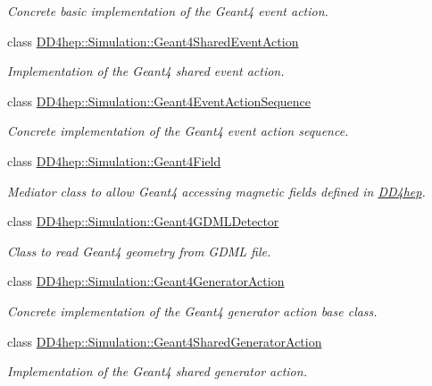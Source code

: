 \begin{DoxyCompactItemize}
\begin{DoxyCompactList}\small\item\em Concrete basic implementation of the Geant4 event action. \end{DoxyCompactList}\item 
class \hyperlink{class_d_d4hep_1_1_simulation_1_1_geant4_shared_event_action}{D\+D4hep\+::\+Simulation\+::\+Geant4\+Shared\+Event\+Action}
\begin{DoxyCompactList}\small\item\em Implementation of the Geant4 shared event action. \end{DoxyCompactList}\item 
class \hyperlink{class_d_d4hep_1_1_simulation_1_1_geant4_event_action_sequence}{D\+D4hep\+::\+Simulation\+::\+Geant4\+Event\+Action\+Sequence}
\begin{DoxyCompactList}\small\item\em Concrete implementation of the Geant4 event action sequence. \end{DoxyCompactList}\item 
class \hyperlink{class_d_d4hep_1_1_simulation_1_1_geant4_field}{D\+D4hep\+::\+Simulation\+::\+Geant4\+Field}
\begin{DoxyCompactList}\small\item\em Mediator class to allow Geant4 accessing magnetic fields defined in \hyperlink{namespace_d_d4hep}{D\+D4hep}. \end{DoxyCompactList}\item 
class \hyperlink{class_d_d4hep_1_1_simulation_1_1_geant4_g_d_m_l_detector}{D\+D4hep\+::\+Simulation\+::\+Geant4\+G\+D\+M\+L\+Detector}
\begin{DoxyCompactList}\small\item\em Class to read Geant4 geometry from G\+D\+ML file. \end{DoxyCompactList}\item 
class \hyperlink{class_d_d4hep_1_1_simulation_1_1_geant4_generator_action}{D\+D4hep\+::\+Simulation\+::\+Geant4\+Generator\+Action}
\begin{DoxyCompactList}\small\item\em Concrete implementation of the Geant4 generator action base class. \end{DoxyCompactList}\item 
class \hyperlink{class_d_d4hep_1_1_simulation_1_1_geant4_shared_generator_action}{D\+D4hep\+::\+Simulation\+::\+Geant4\+Shared\+Generator\+Action}
\begin{DoxyCompactList}\small\item\em Implementation of the Geant4 shared generator action. \end{DoxyCompactList}\item 

\end{DoxyCompactItemize}
